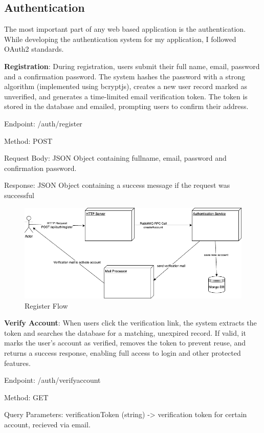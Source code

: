 \subsection{Authentication}
The most important part of any web based application is the authentication. While developing the authentication system for my application, I followed OAuth2\cite{OAUTH2} standards. 

\textbf{Registration}: During registration, users submit their full name, email, password and a confirmation password. The system hashes the password with a strong algorithm (implemented using bcryptjs), creates a new user record marked as unverified, and generates a time-limited email verification token. The token is stored in the database and emailed, prompting users to confirm their address.

Endpoint: /auth/register

Method: POST

Request Body: JSON Object containing fullname, email, password and confirmation password.

Response: JSON Object containing a success message if the request was successful

\begin{figure}[H]
  \centering
  \includegraphics[width=1\linewidth]{licenta-register.drawio.png}
  \caption*{Register Flow}
  \label{fig:register-flow}
\end{figure}

\textbf{Verify Account}: When users click the verification link, the system extracts the token and searches the database for a matching, unexpired record. If valid, it marks the user’s account as verified, removes the token to prevent reuse, and returns a success response, enabling full access to login and other protected features.

Endpoint: /auth/verifyaccount

Method: GET

Query Parameters: verificationToken (string) -> verification token for certain account, recieved via email.

